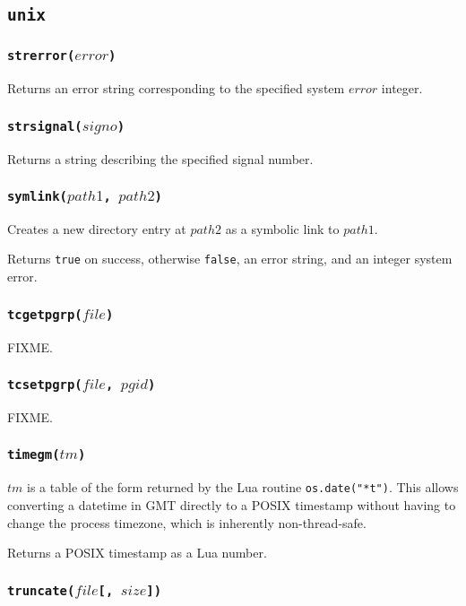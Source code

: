 \documentclass[11pt, oneside]{memoir}
\newcommand*{\true}[0]{\texttt{true}\xspace}
\newcommand*{\false}[0]{\texttt{false}\xspace}
\newcommand*{\fn}[1]{\texttt{#1}\xspace}
\newcounter{toccols}
\newenvironment{Module}[1]{
	\subsection{\texttt{#1}}
	\addtocontents{toc}{
		\protect\begin{multicols}{\value{toccols}}
	}
}{
	\addtocontents{toc}{\protect\end{multicols}}
}
\begin{document}
\begin{Module}{unix}
\subsubsection[\fn{strerror}]{\fn{strerror($error$)}}

Returns an error string corresponding to the specified system $error$ integer.

\subsubsection[\fn{strsignal}]{\fn{strsignal($signo$)}}

Returns a string describing the specified signal number.

\subsubsection[\fn{symlink}]{\fn{symlink($path1$, $path2$)}}

Creates a new directory entry at $path2$ as a symbolic link to $path1$.

Returns \true on success, otherwise \false, an error string, and an integer system error. 

\subsubsection[\fn{tcgetpgrp}]{\fn{tcgetpgrp($file$)}}

FIXME.

\subsubsection[\fn{tcsetpgrp}]{\fn{tcsetpgrp($file$, $pgid$)}}

FIXME.

\subsubsection[\fn{timegm}]{\fn{timegm($tm$)}}

$tm$ is a table of the form returned by the Lua routine \fn{os.date("*t")}. This allows converting a datetime in GMT directly to a POSIX timestamp without having to change the process timezone, which is inherently non-thread-safe.

Returns a POSIX timestamp as a Lua number.

\subsubsection[\fn{truncate}]{\fn{truncate($file$[, $size$])}}


\end{Module}
\end{document}
